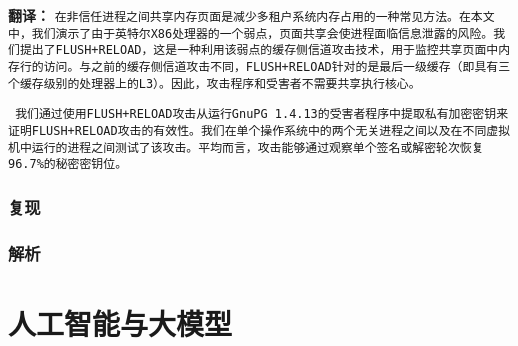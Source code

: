 \documentclass[10pt]{article}
\begin{document}
    \begin{remark}\textbf{翻译：}
        \texttt{在非信任进程之间共享内存页面是减少多租户系统内存占用的一种常见方法。在本文中，我们演示了由于英特尔X86处理器的一个弱点，页面共享会使进程面临信息泄露的风险。我们提出了FLUSH+RELOAD，这是一种利用该弱点的缓存侧信道攻击技术，用于监控共享页面中内存行的访问。与之前的缓存侧信道攻击不同，FLUSH+RELOAD针对的是最后一级缓存（即具有三个缓存级别的处理器上的L3）。因此，攻击程序和受害者不需要共享执行核心。}

        \texttt{
        我们通过使用FLUSH+RELOAD攻击从运行GnuPG 1.4.13的受害者程序中提取私有加密密钥来证明FLUSH+RELOAD攻击的有效性。我们在单个操作系统中的两个无关进程之间以及在不同虚拟机中运行的进程之间测试了该攻击。平均而言，攻击能够通过观察单个签名或解密轮次恢复96.7\%的秘密密钥位。} 
    \end{remark}

    \subsubsection{复现}

    \subsubsection{解析}

  \newpage

  \section{人工智能与大模型}\label{sec:Ai}

    \newpage

    
    
\end{document}
